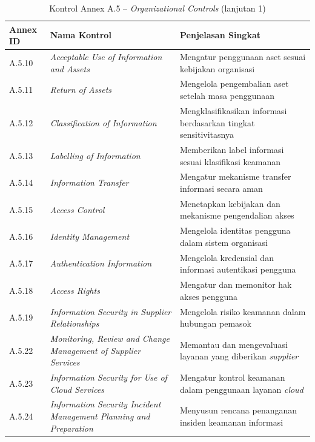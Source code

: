 \begin{table}[H]
\centering
\small
\caption{Kontrol Annex A.5 -- \textit{Organizational Controls} (lanjutan 1) \cite{isoiec20227001}}
\label{tab:annex_a5_lanjutan1}
\begin{tabular}{|P{1.6cm}|P{5.0cm}|P{6.4cm}|}
\hline
\textbf{Annex ID} & \textbf{Nama Kontrol} & \textbf{Penjelasan Singkat} \\
\hline
A.5.10 & \textit{Acceptable Use of Information and Assets}                       & Mengatur penggunaan aset sesuai kebijakan organisasi \\
\hline
A.5.11 & \textit{Return of Assets}                                               & Mengelola pengembalian aset setelah masa penggunaan \\
\hline
A.5.12 & \textit{Classification of Information}                                  & Mengklasifikasikan informasi berdasarkan tingkat sensitivitasnya \\
\hline
A.5.13 & \textit{Labelling of Information}                                       & Memberikan label informasi sesuai klasifikasi keamanan \\
\hline
A.5.14 & \textit{Information Transfer}                                           & Mengatur mekanisme transfer informasi secara aman \\
\hline
A.5.15 & \textit{Access Control}                                                 & Menetapkan kebijakan dan mekanisme pengendalian akses \\
\hline
A.5.16 & \textit{Identity Management}                                            & Mengelola identitas pengguna dalam sistem organisasi \\
\hline
A.5.17 & \textit{Authentication Information}                                     & Mengelola kredensial dan informasi autentikasi pengguna \\
\hline
A.5.18 & \textit{Access Rights}                                                  & Mengatur dan memonitor hak akses pengguna \\
\hline
A.5.19 & \textit{Information Security in Supplier Relationships}                 & Mengelola risiko keamanan dalam hubungan pemasok \\
\hline
A.5.22 & \textit{Monitoring, Review and Change Management of Supplier Services}  & Memantau dan mengevaluasi layanan yang diberikan \textit{supplier} \\
\hline
A.5.23 & \textit{Information Security for Use of Cloud Services}                 & Mengatur kontrol keamanan dalam penggunaan layanan \textit{cloud} \\
\hline
A.5.24 & \textit{Information Security Incident Management Planning and Preparation} & Menyusun rencana penanganan insiden keamanan informasi \\
\hline

\end{tabular}
\end{table}

